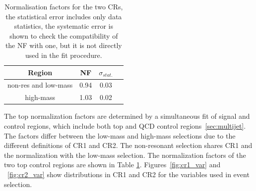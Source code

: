 \begin{table}
\label{tab:NFs}
\begin{center}
\begin{tabular}{|c|c|c|c|}
\hline
Region & NF & $\sigma_{stat.}$ \\%
\hline
non-res and low-mass & 0.94 & 0.03 \\%
high-mass & 1.03 & 0.02 \\%
\hline
\end{tabular}
\end{center}
\caption{Normalisation factors for the two CRs, the statistical error includes only data statistics, the systematic error is shown to check the compatibility of the NF with one, but it is not directly used in the fit procedure.} 
\end{table}

The top normalization factors are determined by a simultaneous fit of signal and control regions, which include both top and QCD control regions~\ref{sec:multijet}. The factors differ between the low-mass and high-mass selections due to the different definitions of CR1 and CR2. The non-resonant selection shares CR1 and the \ttbar normalization with the low-mass selection. The normalization factors of the two top control regions are shown in Table \ref{tab:NFs}. Figures~\ref{fig:cr1_var} and ~\ref{fig:cr2_var} show distributions in CR1 and CR2 for the variables used in event selection.

